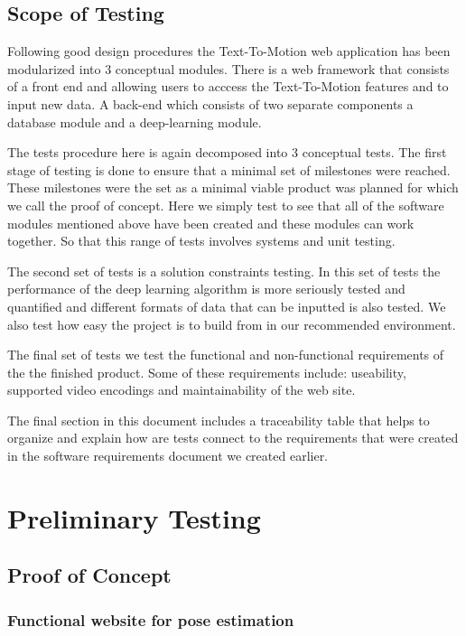 \documentclass{scrreprt}
\begin{document}
\section{Scope of Testing}
Following good design procedures the Text-To-Motion web application has been modularized into $3$ conceptual modules.  There is a web framework that consists of a front end and allowing users to acccess the Text-To-Motion features and to input new data.  A back-end which consists of two separate components a database module and a deep-learning module.

The tests procedure here is again decomposed into $3$ conceptual tests.  The first stage of testing is done to ensure that a minimal set of milestones were reached.  These milestones were the set as a minimal viable product was planned for which we call the proof of concept.  Here we simply test to see that all of the software modules mentioned above have been created and these modules can work together.  So that this range of tests involves systems and unit testing.

The second set of tests is a solution constraints testing.  In this set of tests the performance of the deep learning algorithm is more seriously tested and quantified and different formats of data that can be inputted is also tested.  We also test how easy the project is to build from in our recommended environment.

The final set of tests we test the functional and non-functional requirements of the the finished product. Some of these requirements include: useability, supported video encodings and maintainability of the web site.

The final section in this document includes a traceability table that helps to organize and explain how are tests connect to the requirements that were created in the software requirements document we created earlier.

\chapter{Preliminary Testing}

\section{Proof of Concept}
\subsection{Functional website for pose estimation}
\end{document}
